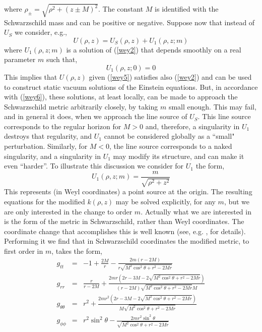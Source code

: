 \documentclass[12pt,aps,floats,showpacs,amssymb,tightenlines]{revtex4}
\begin{document}
where $\rho_{\pm}=\sqrt{\rho^2+(z\pm M)^2}$. The constant $M$ is
identified with the Schwarzschild mass and can be positive or
negative. Suppose now that instead of $U_S$ we consider, e.g.,
\begin{equation}
\label{wey5} U(\rho,z) = U_S(\rho,z)+U_1(\rho,z;m)
\end{equation}
where $U_1(\rho,z;m)$ is a solution of (\ref{wey2}) that depends
smoothly on a real parameter $m$ such that,
\begin{equation}
\label{wey6}
 U_1(\rho,z;0)= 0
\end{equation}
This implies that $U(\rho,z)$ given (\ref{wey5}) satisfies also
(\ref{wey2}) and can be used to construct static vacuum solutions of
the Einstein equations. But, in accordance with (\ref{wey6}), these
solutions, at least locally, can be made to approach the
Schwarzschild metric arbitrarily closely, by taking $m$ small
enough. This may fail, and in general it does,
 when we approach the line source of $U_S$. This line source corresponds to the regular horizon
 for $M>0$ and, therefore, a singularity in $U_1$ destroys that regularity, and $U_1$ cannot be
  considered globally as a ``small" perturbation. Similarly, for $M<0$, the line source
  corresponds to a naked singularity, and a singularity in $U_1$ may modify its structure,
  and can make it even ``harder''. To illustrate this discussion we consider for $U_1$ the form,
\begin{equation}
\label{wey7} U_1(\rho,z;m) = \frac{m}{\sqrt{\rho^2+z^2}}
\end{equation}
This represents (in Weyl coordinates) a point source at the origin.
The resulting equations
 for the modified $k(\rho,z)$ may be solved explicitly, for any $m$, but we are only interested
 in the change to order $m$. Actually what we are interested in is the form of the metric
 in Schwarzschild, rather than Weyl coordinates. The coordinate change that accomplishes
 this is well known (see, e.g. \cite{exactas}, for details). Performing it we find that
 in Schwarzschild coordinates the modified metric, to first order in $m$, takes the form,
\begin{eqnarray}
\label{wey8} g_{tt} & = & -1+ {\frac {2M}{r}}-{\frac {2 m \left(
r-2M \right) }{r \sqrt {{M}^{2} \cos^2 \theta   +{r}^{2} -2Mr}}}
\nonumber \\
g_{rr} & = & {\frac {r}{r-2 M}}+{\frac {2 mr \left( 2r-3M-2 \sqrt {
{M}^{2} \cos^2 \theta +{r}^{2} -2Mr} \right) }{ \left(r -2M\right)
\sqrt { {M}^{2}\cos^2 \theta    +{r}^{2}-2Mr}M}}
\nonumber \\
g_{\theta \theta} & = & {r}^{2}+{\frac {2 m {r}^{2} \left(2 r
-3M-2\sqrt {
 {M}^{2} \cos^2 \theta   +{r}^{2}-2Mr}
 \right) }{M\sqrt {M^2  \cos^2  \theta +{r}^{2}-2Mr}}}
\nonumber \\
g_{\phi \phi} & = &  r^2 \sin^2  \theta -{\frac {2 m r^2
  \sin^2  \theta  }{
\sqrt { M^2 \cos^2 \theta +{r}^{2} -2Mr}}}
\end{eqnarray}
\end{document}

